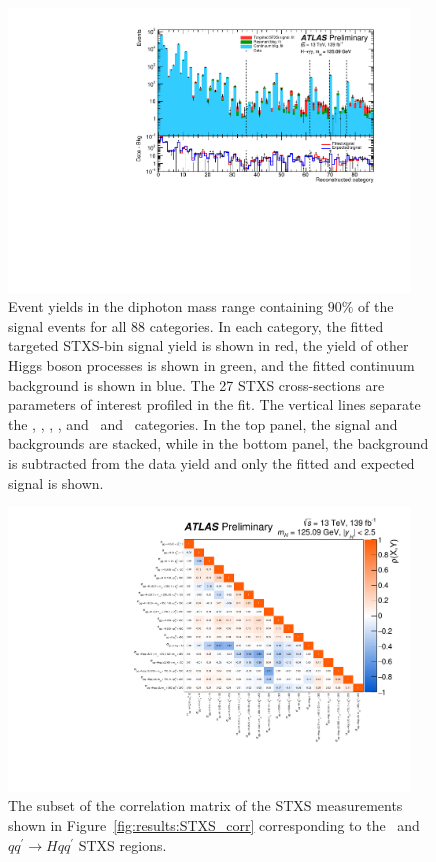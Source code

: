 \begin{figure}[!h]
    \centering
    \includegraphics[width=0.95\textwidth]{figures/couplings_chapter/STXSfitvisualization.pdf}
    \caption{Event yields in the diphoton mass range containing $90\%$ of the signal events for all 88 categories. In each category, the fitted targeted STXS-bin signal yield is shown in red, the yield of other Higgs boson processes is shown in green, and the fitted continuum background is shown in blue. The 27 STXS cross-sections are parameters of interest profiled in the fit. The vertical lines separate the \ggF, \VBF, \WH, \ZH, and \ttH\ and \tH\ categories. In the top panel, the signal and backgrounds are stacked, while in the bottom panel, the background is subtracted from the data yield and only the fitted and expected signal is shown.}
    \label{fig:STXSfit}
\end{figure}

\begin{figure}[htb!]
    \centering
    \includegraphics[width=0.95\textwidth]{figures/couplings_chapter/corrmat_STXS_obs_ggH_VBF.pdf}
    \caption{The subset of the correlation matrix of the STXS measurements shown in Figure~\ref{fig:results:STXS_corr} corresponding to the \ggtoH\ and $qq^\prime\to H qq^\prime$ STXS regions.}
    \label{fig:correlationggFqqHqq}
\end{figure}

